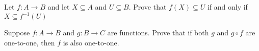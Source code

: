 \documentclass[12pt]{article}
\begin{document}

\begin{qu}
Let $f:A \to B$ and let $X \subseteq A$ and $U \subseteq B$. Prove that $f(X) \subseteq U$ if and only if $X\subseteq f^{-1}(U)$
\end{qu}

\begin{qu}
Suppose $f:A \to B$ and $g: B \to C$ are functions. Prove that if both $g$ and $g\circ f$ are one-to-one, then $f$ is also one-to-one.
\end{qu}
\end{document}
